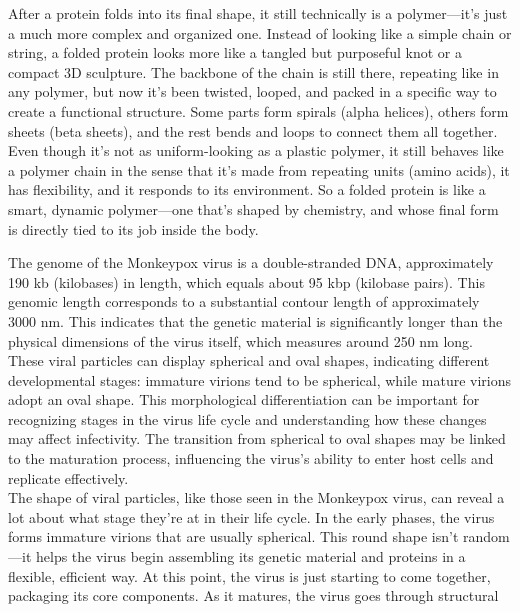 \documentclass[12pt]{article}
\begin{document}
\begin{flushleft}
After a protein folds into its final shape, it still technically is a polymer—it’s just a much more complex and organized one. Instead of looking like a simple chain or string, a folded protein looks more like a tangled but purposeful knot or a compact 3D sculpture. The backbone of the chain is still there, repeating like in any polymer, but now it's been twisted, looped, and packed in a specific way to create a functional structure. Some parts form spirals (alpha helices), others form sheets (beta sheets), and the rest bends and loops to connect them all together. Even though it’s not as uniform-looking as a plastic polymer, it still behaves like a polymer chain in the sense that it’s made from repeating units (amino acids), it has flexibility, and it responds to its environment. So a folded protein is like a smart, dynamic polymer—one that’s shaped by chemistry, and whose final form is directly tied to its job inside the body.



The genome of the Monkeypox virus is a double-stranded DNA, approximately 190 kb (kilobases) in length, which equals about 95 kbp (kilobase pairs). This genomic length corresponds to a substantial contour length of approximately 3000 nm. This indicates that the genetic material is significantly longer than the physical dimensions of the virus itself, which measures around 250 nm long. 
These viral particles can display spherical and oval shapes, indicating different developmental stages: immature virions tend to be spherical, while mature virions adopt an oval shape. This morphological differentiation can be important for recognizing stages in the virus life cycle and understanding how these changes may affect infectivity. The transition from spherical to oval shapes may be linked to the maturation process, influencing the virus's ability to enter host cells and replicate effectively.\\

The shape of viral particles, like those seen in the Monkeypox virus, can reveal a lot about what stage they’re at in their life cycle. In the early phases, the virus forms immature virions that are usually spherical. This round shape isn’t random—it helps the virus begin assembling its genetic material and proteins in a flexible, efficient way. At this point, the virus is just starting to come together, packaging its core components. As it matures, the virus goes through structural 


\end{flushleft}
\end{document}
